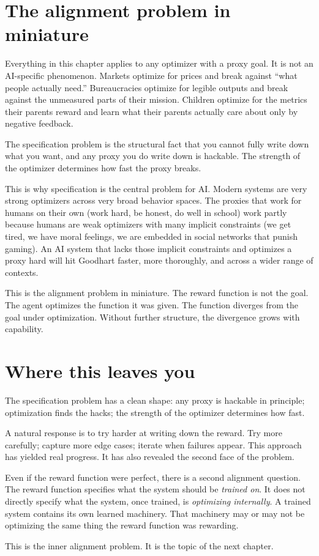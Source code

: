 \section*{The alignment problem in miniature}

Everything in this chapter applies to any optimizer with a proxy goal. It is not an AI-specific phenomenon. Markets optimize for prices and break against ``what people actually need.'' Bureaucracies optimize for legible outputs and break against the unmeasured parts of their mission. Children optimize for the metrics their parents reward and learn what their parents actually care about only by negative feedback.

The specification problem is the structural fact that you cannot fully write down what you want, and any proxy you do write down is hackable. The strength of the optimizer determines how fast the proxy breaks.

This is why specification is the central problem for AI. Modern systems are very strong optimizers across very broad behavior spaces. The proxies that work for humans on their own (work hard, be honest, do well in school) work partly because humans are weak optimizers with many implicit constraints (we get tired, we have moral feelings, we are embedded in social networks that punish gaming). An AI system that lacks those implicit constraints and optimizes a proxy hard will hit Goodhart faster, more thoroughly, and across a wider range of contexts.

This is the alignment problem in miniature. The reward function is not the goal. The agent optimizes the function it was given. The function diverges from the goal under optimization. Without further structure, the divergence grows with capability.

\section*{Where this leaves you}

The specification problem has a clean shape: any proxy is hackable in principle; optimization finds the hacks; the strength of the optimizer determines how fast.

A natural response is to try harder at writing down the reward. Try more carefully; capture more edge cases; iterate when failures appear. This approach has yielded real progress. It has also revealed the second face of the problem.

Even if the reward function were perfect, there is a second alignment question. The reward function specifies what the system should be \emph{trained on}. It does not directly specify what the system, once trained, is \emph{optimizing internally}. A trained system contains its own learned machinery. That machinery may or may not be optimizing the same thing the reward function was rewarding.

This is the inner alignment problem. It is the topic of the next chapter.
